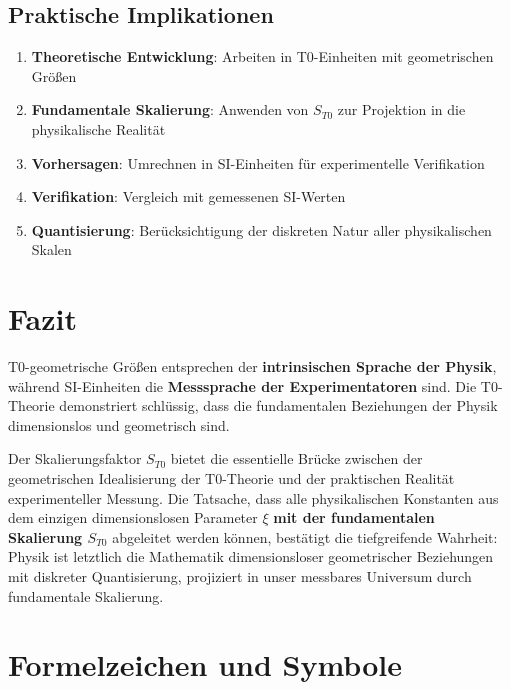 \documentclass[12pt,a4paper]{article}
\begin{document}
	\subsection{Praktische Implikationen}
	\begin{enumerate}
		\item \textbf{Theoretische Entwicklung}: Arbeiten in T0-Einheiten mit geometrischen Größen
		\item \textbf{Fundamentale Skalierung}: Anwenden von $S_{T0}$ zur Projektion in die physikalische Realität
		\item \textbf{Vorhersagen}: Umrechnen in SI-Einheiten für experimentelle Verifikation
		\item \textbf{Verifikation}: Vergleich mit gemessenen SI-Werten
		\item \textbf{Quantisierung}: Berücksichtigung der diskreten Natur aller physikalischen Skalen
	\end{enumerate}
	
	\section{Fazit}
	
	T0-geometrische Größen entsprechen der \textbf{intrinsischen Sprache der Physik}, während SI-Einheiten die \textbf{Messsprache der Experimentatoren} sind. Die T0-Theorie demonstriert schlüssig, dass die fundamentalen Beziehungen der Physik dimensionslos und geometrisch sind.
	
	Der Skalierungsfaktor $S_{T0}$ bietet die essentielle Brücke zwischen der geometrischen Idealisierung der T0-Theorie und der praktischen Realität experimenteller Messung. Die Tatsache, dass alle physikalischen Konstanten aus dem einzigen dimensionslosen Parameter $\xi$ \textbf{mit der fundamentalen Skalierung $S_{T0}$} abgeleitet werden können, bestätigt die tiefgreifende Wahrheit: Physik ist letztlich die Mathematik dimensionsloser geometrischer Beziehungen mit diskreter Quantisierung, projiziert in unser messbares Universum durch fundamentale Skalierung.
	
	\appendix
	\section{Formelzeichen und Symbole}
	
\end{document}
